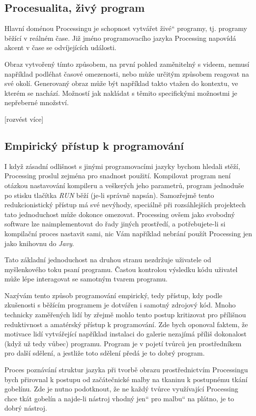 \documentclass[11pt]{book}
\renewcommand\uv[1]{\quotedblbase #1\textquotedblleft}%
\newcommand{\pododdil}[1]{\subsection{#1}\label{subsec:#1}}
\begin{document}
\pododdil{Procesualita, živý program}

Hlavní doménou Processingu je schopnost vytvářet \uv{živé} programy, tj. programy běžící v reálném čase. Již jméno programovacího jazyka Processing napovídá akcent v čase se odvíjejících události.

Obraz vytvořený tímto způsobem, na první pohled zaměnitelný s videem, nemusí například podléhat časové omezenosti, nebo může určitým způsobem reagovat na své okolí. Generovaný obraz může být například takto vtažen do kontextu, ve kterém se nachází. Možností jak nakládat s těmito specifickými možnostmi je nepřeberné množství.

[rozvést více]

\pododdil{Empirický přístup k programování}

	I když zásadní odlišnost s jinými programovacími jazyky bychom hledali stěží, Processing proslul zejména pro snadnost použití. Kompilovat program není otázkou nastavování kompileru a veškerých jeho parametrů, program jednoduše po stisku tlačítka {\em RUN} běží (je-li správně napsán). Samozřejmě tento redukcionistický přístup má své nevýhody, speciálně při rozsáhlejších projektech tato jednoduchost může dokonce omezovat. Processing ovšem jako svobodný software lze naimplementovat do řady jiných prostředí, a potřebujete-li si kompilační proces nastavit sami, nic Vám například nebrání použít Processing jen jako knihovnu do {\em Javy}.

Tato základní jednoduchost na druhou stranu nezdržuje uživatele od myšlenkového toku psaní programu. Častou kontrolou výsledku kódu uživatel může lépe interagovat se samotným tvarem programu.

Nazývám tento způsob programování empirický, tedy přístup, kdy podle zkušenosti s běžícím programem je dotvářen i samotný zdrojový kód. Mnoho technicky zaměřených lidí by zřejmě mohlo tento postup kritizovat pro přílišnou reduktivnost a amatérský přístup k programování. Zde bych oponoval faktem, že motivace lidí vytvářející například instalaci do galerie nezajímá příliš dokonalost (když už tedy vůbec) programu. Program je v pojetí tvůrců jen prostředníkem pro další sdělení, a jestliže toto sdělení předá je to dobrý program.

Proces poznávání struktur jazyka při tvorbě obrazu prostřednictvím Processingu bych přirovnal k postupu od začátečnické malby na tkaninu k postupnému tkání gobelínu. Zde je nutno podotknout, že ne každý tvůrce využívající Processing chce tkát gobelín a najde-li nástroj vhodný \uv{jen} pro \uv{malbu} na plátno, je to dobrý nástroj.
\end{document}

